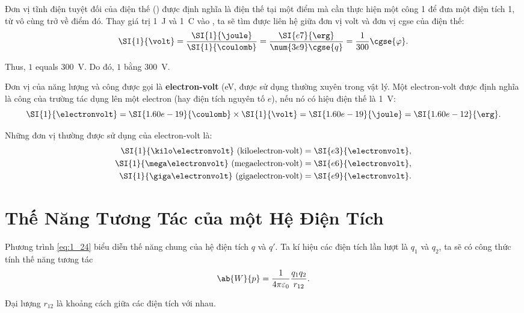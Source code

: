 Đơn vị tĩnh điện tuyệt đối của điện thế (\cgse{\varphi}) được định nghĩa là điện thế tại một điểm mà cần thực hiện một công \SI{1}{\erg} để đưa một điện tích \num{+1}, từ vô cùng trở về điểm đó. Thay giá trị \SI{1}{\joule} và \SI{1}{\coulomb} vào , ta sẽ tìm được liên hệ giữa đơn vị volt và đơn vị cgse của điện thế:
\begin{equation}\label{eq:1_33}
	\SI{1}{\volt} = \frac{\SI{1}{\joule}}{\SI{1}{\coulomb}} = \frac{\SI{e7}{\erg}}{\num{3e9}\cgse{q}} = \frac{1}{300}\cgse{\varphi}.
\end{equation}

\noindent
Thus, $1$\cgse{\varphi} equals \SI{300}{\volt}. Do đó, $1$\cgse{\varphi} bằng \SI{300}{\volt}.

Đơn vị của năng lượng và công được gọi là \textbf{electron-volt} (\si{\electronvolt}, được sử dụng thường xuyên trong vật lý. Một electron-volt được định nghĩa là công của trường tác dụng lên một electron (hay điện tích nguyên tố $e$), nếu nó có hiệu điện thế là \SI{1}{\volt}:
\begin{equation}\label{eq:1_34}
	\SI{1}{\electronvolt} = \SI{1.60e-19}{\coulomb} \times \SI{1}{\volt} = \SI{1.60e-19}{\joule} = \SI{1.60e-12}{\erg}.
\end{equation}

\noindent
Những đơn vị thường được sử dụng của electron-volt là:
\begin{align*}
	\text{\SI{1}{\kilo\electronvolt} (kiloelectron-volt)} &= \SI{e3}{\electronvolt},\\
	\text{\SI{1}{\mega\electronvolt} (megaelectron-volt)} &= \SI{e6}{\electronvolt},\\
	\text{\SI{1}{\giga\electronvolt} (gigaelectron-volt)} &= \SI{e9}{\electronvolt}.
\end{align*}

\section{Thế Năng Tương Tác của một Hệ Điện Tích}\label{sec:1_7}

Phương trình \eqref{eq:1_24} biểu diễn thế năng chung của hệ điện tích $q$ và $q'$. Ta kí hiệu các điện tích lần lượt là $q_1$ và $q_2$, ta sẽ có công thức tính thế năng tương tác
\begin{equation}\label{eq:1_35}
	\ab{W}{p} = \frac{1}{4\pi\varepsilon_0} \frac{q_1q_2}{r_{12}}.
\end{equation}

\noindent
Đại lượng $r_{12}$ là khoảng cách giữa các điện tích với nhau.

